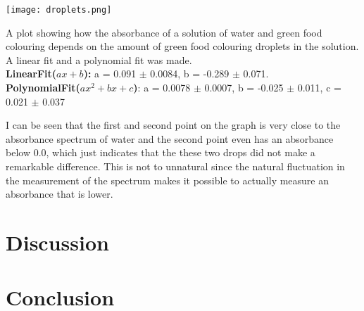 \documentclass[working, oneside]{inputs/tuftebook}
\begin{document}
\begin{marginfigure}
\centering
\texttt{[image: droplets.png]}
\caption{A plot showing how the absorbance of a solution of water and green food colouring depends on the amount of green food colouring droplets in the solution. A linear fit and a polynomial fit was made.\\ 
\textbf{LinearFit($ax+b$):} a = 0.091 $\pm$ 0.0084, b = -0.289 $\pm$ 0.071. \\
\textbf{PolynomialFit($ax^2 + bx +c$)}: a = 0.0078 $\pm$ 0.0007, b = -0.025 $\pm$ 0.011, c = 0.021 $\pm$ 0.037}
\end{marginfigure}
I can be seen that the first and second point on the graph is very close to the absorbance spectrum of water and the second point even has an absorbance below 0.0, which just indicates that the these two drops did not make a remarkable difference. This is not to unnatural since the natural fluctuation in the measurement of the spectrum makes it possible to actually measure an absorbance that is lower.


\section*{Discussion}
\section*{Conclusion}
\end{document}
